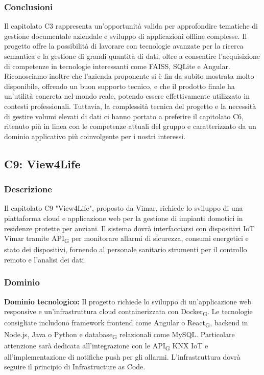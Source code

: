 \documentclass[11pt,a4paper]{article}
\newcommand{\gls}[1]{#1\textsubscript{G}}
\begin{document}
\subsubsection{Conclusioni}
Il capitolato C3 rappresenta un'opportunità valida per approfondire tematiche di gestione documentale aziendale e sviluppo di applicazioni offline complesse. Il progetto offre la possibilità di lavorare con tecnologie avanzate per la ricerca semantica e la gestione di grandi quantità di dati, oltre a consentire l'acquisizione di competenze in tecnologie interessanti come FAISS, SQLite e Angular. Riconosciamo inoltre che l'azienda proponente si è fin da subito mostrata molto disponibile, offrendo un buon supporto tecnico, e che il prodotto finale ha un'utilità concreta nel mondo reale, potendo essere effettivamente utilizzato in contesti professionali. Tuttavia, la complessità tecnica del progetto e la necessità di gestire volumi elevati di dati ci hanno portato a preferire il capitolato C6, ritenuto più in linea con le competenze attuali del gruppo e caratterizzato da un dominio applicativo più coinvolgente per i nostri interessi.

\subsection{C9: View4Life}

\subsubsection{Descrizione}
Il capitolato C9 "View4Life", proposto da Vimar, richiede lo sviluppo di una piattaforma cloud e applicazione web per la gestione di impianti domotici in residenze protette per anziani. Il sistema dovrà interfacciarsi con dispositivi IoT Vimar tramite \gls{API} per monitorare allarmi di sicurezza, consumi energetici e stato dei dispositivi, fornendo al personale sanitario strumenti per il controllo remoto e l'analisi dei dati.

\subsubsection{Dominio}
\textbf{Dominio tecnologico:} Il progetto richiede lo sviluppo di un'applicazione web responsive e un'infrastruttura cloud containerizzata con \gls{Docker}. Le tecnologie consigliate includono framework frontend come Angular o \gls{React}, backend in Node.js, Java o Python e \gls{database} relazionali come MySQL. Particolare attenzione sarà dedicata all'integrazione con le \gls{API} KNX IoT e all'implementazione di notifiche push per gli allarmi. L'infrastruttura dovrà seguire il principio di Infrastructure as Code.
\end{document}
